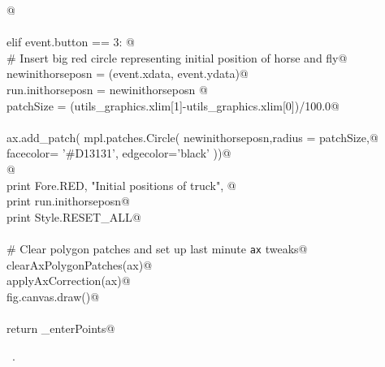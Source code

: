 \documentclass[11.5pt]{report}
\begin{document}
\begin{flushleft}
\begin{list}{}{}
\mbox{}\verb@                 @\\
\mbox{}\verb@@\\
\mbox{}\verb@             elif event.button == 3:  @\\
\mbox{}\verb@                 # Insert big red circle representing initial position of horse and fly@\\
\mbox{}\verb@                 newinithorseposn  = (event.xdata, event.ydata)@\\
\mbox{}\verb@                 run.inithorseposn = newinithorseposn  @\\
\mbox{}\verb@                 patchSize         = (utils_graphics.xlim[1]-utils_graphics.xlim[0])/100.0@\\
\mbox{}\verb@@\\
\mbox{}\verb@                 ax.add_patch( mpl.patches.Circle( newinithorseposn,radius = patchSize,@\\
\mbox{}\verb@                                                   facecolor= '#D13131', edgecolor='black' ))@\\
\mbox{}\verb@                 @\\
\mbox{}\verb@                 print Fore.RED, "Initial positions of truck\n", @\\
\mbox{}\verb@                 print run.inithorseposn@\\
\mbox{}\verb@                 print Style.RESET_ALL@\\
\mbox{}\verb@@\\
\mbox{}\verb@             # Clear polygon patches and set up last minute \verb|ax| tweaks@\\
\mbox{}\verb@             clearAxPolygonPatches(ax)@\\
\mbox{}\verb@             applyAxCorrection(ax)@\\
\mbox{}\verb@             fig.canvas.draw()@\\
\mbox{}\verb@@\\
\mbox{}\verb@    return _enterPoints@\\
\mbox{}\verb@@{\NWsep}
\end{list}
\vspace{-1.5ex}
\footnotesize
\begin{list}{}{\setlength{\itemsep}{-\parsep}\setlength{\itemindent}{-\leftmargin}}
\item \NWtxtMacroRefIn\ .

\item{}
\end{list}
\vspace{4ex}
\end{flushleft}
\end{document}
